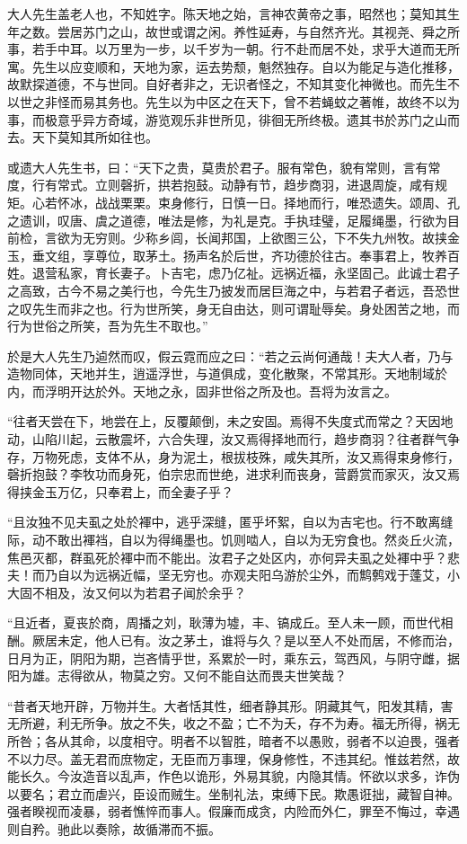 \documentclass[UTF8,titlepage,oneside]{ctexbook}
\begin{document}
大人先生盖老人也，不知姓字。陈天地之始，言神农黄帝之事，昭然也；莫知其生年之数。尝居苏门之山，故世或谓之闲。养性延寿，与自然齐光。其视尧、舜之所事，若手中耳。以万里为一步，以千岁为一朝。行不赴而居不处，求乎大道而无所寓。先生以应变顺和，天地为家，运去势颓，魁然独存。自以为能足与造化推移，故默探道德，不与世同。自好者非之，无识者怪之，不知其变化神微也。而先生不以世之非怪而易其务也。先生以为中区之在天下，曾不若蝇蚊之著帷，故终不以为事，而极意乎异方奇域，游览观乐非世所见，徘徊无所终极。遗其书於苏门之山而去。天下莫知其所如往也。


或遗大人先生书，曰：“天下之贵，莫贵於君子。服有常色，貌有常则，言有常度，行有常式。立则磬折，拱若抱鼓。动静有节，趋步商羽，进退周旋，咸有规矩。心若怀冰，战战栗栗。束身修行，日慎一日。择地而行，唯恐遗失。颂周、孔之遗训，叹唐、虞之道德，唯法是修，为礼是克。手执珪璧，足履绳墨，行欲为目前检，言欲为无穷则。少称乡闾，长闻邦国，上欲图三公，下不失九州牧。故挟金玉，垂文组，享尊位，取茅土。扬声名於后世，齐功德於往古。奉事君上，牧养百姓。退营私家，育长妻子。卜吉宅，虑乃亿祉。远祸近福，永坚固己。此诚士君子之高致，古今不易之美行也，今先生乃披发而居巨海之中，与若君子者远，吾恐世之叹先生而非之也。行为世所笑，身无自由达，则可谓耻辱矣。身处困苦之地，而行为世俗之所笑，吾为先生不取也。”


於是大人先生乃逌然而叹，假云霓而应之曰：“若之云尚何通哉！夫大人者，乃与造物同体，天地并生，逍遥浮世，与道俱成，变化散聚，不常其形。天地制域於内，而浮明开达於外。天地之永，固非世俗之所及也。吾将为汝言之。


“往者天尝在下，地尝在上，反覆颠倒，未之安固。焉得不失度式而常之？天因地动，山陷川起，云散震坏，六合失理，汝又焉得择地而行，趋步商羽？往者群气争存，万物死虑，支体不从，身为泥土，根拔枝殊，咸失其所，汝又焉得束身修行，磬折抱鼓？李牧功而身死，伯宗忠而世绝，进求利而丧身，营爵赏而家灭，汝又焉得挟金玉万亿，只奉君上，而全妻子乎？


“且汝独不见夫虱之处於褌中，逃乎深缝，匿乎坏絮，自以为吉宅也。行不敢离缝际，动不敢出褌裆，自以为得绳墨也。饥则啮人，自以为无穷食也。然炎丘火流，焦邑灭都，群虱死於褌中而不能出。汝君子之处区内，亦何异夫虱之处褌中乎？悲夫！而乃自以为远祸近幅，坚无穷也。亦观夫阳乌游於尘外，而鹪鹩戏于蓬艾，小大固不相及，汝又何以为若君子闻於余乎？


“且近者，夏丧於商，周播之刘，耿薄为墟，丰、镐成丘。至人未一顾，而世代相酬。厥居未定，他人已有。汝之茅土，谁将与久？是以至人不处而居，不修而治，日月为正，阴阳为期，岂吝情乎世，系累於一时，乘东云，驾西风，与阴守雌，据阳为雄。志得欲从，物莫之穷。又何不能自达而畏夫世笑哉？


“昔者天地开辟，万物并生。大者恬其性，细者静其形。阴藏其气，阳发其精，害无所避，利无所争。放之不失，收之不盈；亡不为夭，存不为寿。福无所得，祸无所咎；各从其命，以度相守。明者不以智胜，暗者不以愚败，弱者不以迫畏，强者不以力尽。盖无君而庶物定，无臣而万事理，保身修性，不违其纪。惟兹若然，故能长久。今汝造音以乱声，作色以诡形，外易其貌，内隐其情。怀欲以求多，诈伪以要名；君立而虐兴，臣设而贼生。坐制礼法，束缚下民。欺愚诳拙，藏智自神。强者睽视而凌暴，弱者憔悴而事人。假廉而成贪，内险而外仁，罪至不悔过，幸遇则自矜。驰此以奏除，故循滞而不振。
\end{document}
